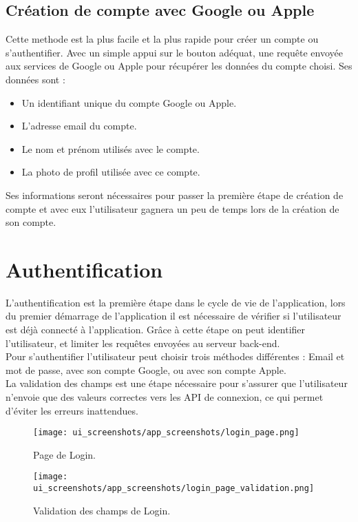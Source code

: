 \subsection{Création de compte avec Google ou Apple}
Cette methode est la plus facile et la plus rapide pour créer un compte ou s'authentifier. Avec un simple appui sur le bouton adéquat, une requête envoyée aux services de Google ou Apple pour récupérer les données du compte choisi. Ses données sont :
\begin{itemize}
    \item Un identifiant unique du compte Google ou Apple.
    \item L'adresse email du compte.
    \item Le nom et prénom utilisés avec le compte.
    \item La photo de profil utilisée avec ce compte.
\end{itemize}
Ses informations seront nécessaires pour passer la première étape de création de compte et avec eux l'utilisateur gagnera un peu de temps lors de la création de son compte.
\vspace{1cm}

\section{Authentification}
L'authentification est la première étape dans le cycle de vie de l'application, lors du premier démarrage de l'application il est nécessaire de vérifier si l'utilisateur est déjà connecté à l'application. Grâce à cette étape on peut identifier l'utilisateur, et limiter les requêtes envoyées au serveur back-end.\\
\noindent Pour s'authentifier l'utilisateur peut choisir trois méthodes différentes : Email et mot de passe, avec son compte Google, ou avec son compte Apple.\\
La validation des champs est une étape nécessaire pour s'assurer que l'utilisateur n'envoie que des valeurs correctes vers les API de connexion, ce qui permet d'éviter les erreurs inattendues.
\vspace{1cm}
\begin{center}
    \begin{multicols}{2}
        \begin{figure}[H]
            \centering
            \texttt{[image: ui\_screenshots/app\_screenshots/login\_page.png]}
            \vspace{1cm}
            \captionsetup{justification=centering}
            \caption{Page de Login.}
            \label{fig:app_login}
        \end{figure}
        \begin{figure}[H]
            \centering
            \texttt{[image: ui\_screenshots/app\_screenshots/login\_page\_validation.png]}
            \vspace{1cm}
            \captionsetup{justification=centering}
            \caption{Validation des champs de Login.}
            \label{fig:app_login_validation}
        \end{figure}
    \end{multicols}
\end{center}


